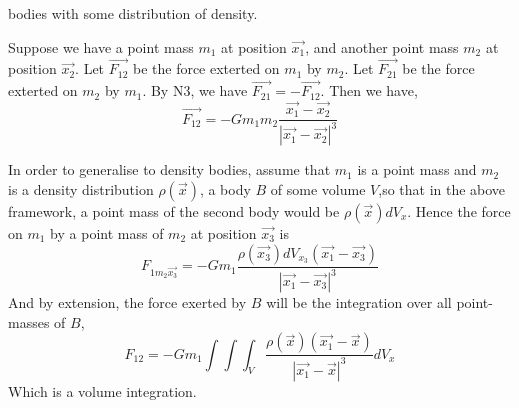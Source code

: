 bodies with some distribution of density.
\begin{theorem}
  Suppose we have a point mass $m_1$ at position $\vec{x_1}$, and another point
  mass $m_2$ at position $\vec{x_2}$. Let $\vec{F_{12}}$ be the force exterted
  on $m_1$ by $m_2$. Let $\vec{F_{21}}$ be the force exterted on $m_2$ by $m_1$.
  By N3, we have $\vec{F_{21}}=-\vec{F_{12}}$. Then we have,
  \[\vec{F_{12}} = -Gm_1m_2\frac{\vec{x_1}-\vec{x_2}}{|\vec{x_1}-\vec{x_2}|^3}\]
  \label{thm:newtonGrav}
\end{theorem}
In order to generalise to density bodies, assume that $m_1$ is a point mass and
$m_2$ is a density distribution $\rho(\vec{x})$, a body $B$ of some volume
$V$,so that in the above framework, a point mass of the second body would be
$\rho(\vec{x})dV_x$. Hence the force on $m_1$ by a point mass of $m_2$ at
position $\vec{x_3}$ is 
\[F_{1m_2\vec{x_3}} = -Gm_1
\frac{\rho(\vec{x_3})dV_{x_3}(\vec{x_1}-\vec{x_3})}{|\vec{x_1}-\vec{x_3}|^3}\]
And by extension, the force exerted by $B$ will be the integration over all
point-masses of $B$, 
\[F_{12} = -Gm_1\int\int\int_{V}
\frac{\rho(\vec{x})(\vec{x_1}-\vec{x})}{|\vec{x_1}-\vec{x}|^3} dV_{x} \]
Which is a volume integration.

